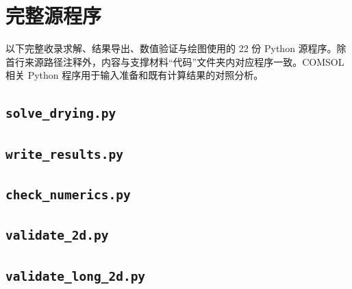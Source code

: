 \clearpage
\section{完整源程序}

以下完整收录求解、结果导出、数值验证与绘图使用的 22 份 Python 源程序。除首行来源路径注释外，内容与支撑材料“代码”文件夹内对应程序一致。COMSOL 相关 Python 程序用于输入准备和既有计算结果的对照分析。
\begingroup
{}
\lstset{basicstyle=\small\appendixcodefont,breaklines=true,breakatwhitespace=false,columns=fullflexible,keepspaces=true,tabsize=4,showstringspaces=false,numbers=none}

\subsection{\texorpdfstring{\texttt{solve\_drying.py}}{solve\_drying.py}}
\label{app:source1}


\label{app:source1end}

\subsection{\texorpdfstring{\texttt{write\_results.py}}{write\_results.py}}
\label{app:source2}


\label{app:source2end}

\subsection{\texorpdfstring{\texttt{check\_numerics.py}}{check\_numerics.py}}
\label{app:source3}


\label{app:source3end}

\subsection{\texorpdfstring{\texttt{validate\_2d.py}}{validate\_2d.py}}
\label{app:source4}


\label{app:source4end}

\subsection{\texorpdfstring{\texttt{validate\_long\_2d.py}}{validate\_long\_2d.py}}
\label{app:source5}

